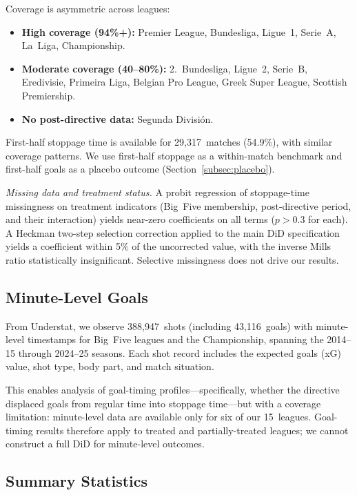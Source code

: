 Coverage is asymmetric across leagues:
\begin{itemize}[leftmargin=*]
\item \textbf{High coverage (94\%+):} Premier League, Bundesliga,
  Ligue~1, Serie~A, La~Liga, Championship.
\item \textbf{Moderate coverage (40--80\%):} 2.~Bundesliga, Ligue~2,
  Serie~B, Eredivisie, Primeira Liga, Belgian Pro League, Greek Super
  League, Scottish Premiership.
\item \textbf{No post-directive data:} Segunda Divisi\'{o}n.
\end{itemize}

First-half stoppage time is available for 29,317~matches (54.9\%),
with similar coverage patterns. We use first-half stoppage as a
within-match benchmark and first-half goals as a placebo outcome
(Section~\ref{subsec:placebo}).

\textit{Missing data and treatment status.} A probit regression of
stoppage-time missingness on treatment indicators (Big~Five
membership, post-directive period, and their interaction) yields
near-zero coefficients on all terms ($p > 0.3$ for each). A Heckman
two-step selection correction applied to the main DiD specification
yields a coefficient within 5\% of the uncorrected value, with the
inverse Mills ratio statistically insignificant. Selective
missingness does not drive our results.

\subsection{Minute-Level Goals}

From Understat, we observe 388,947~shots (including 43,116~goals)
with minute-level timestamps for Big~Five leagues and the
Championship, spanning the 2014--15 through 2024--25 seasons. Each
shot record includes the expected goals (xG) value, shot type, body
part, and match situation.

This enables analysis of goal-timing profiles---specifically,
whether the directive displaced goals from regular time into
stoppage time---but with a coverage limitation: minute-level data
are available only for six of our 15~leagues. Goal-timing results
therefore apply to treated and partially-treated leagues; we cannot
construct a full DiD for minute-level outcomes.

\subsection{Summary Statistics}


